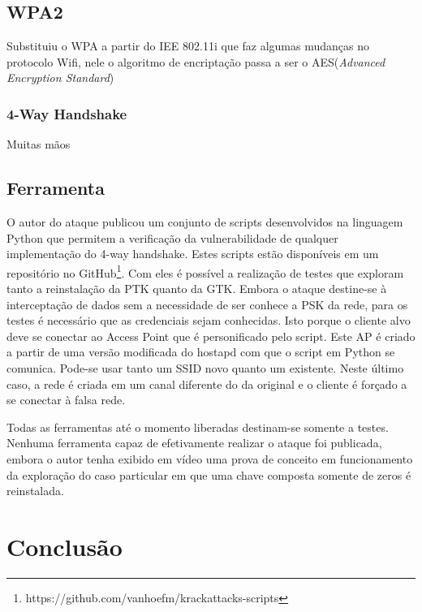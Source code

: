 \documentclass[12pt]{article}
\begin{document}
\subsection{WPA2}
	Substituiu o WPA a partir do IEE 802.11i que faz algumas mudanças no protocolo Wifi, nele o algoritmo de encriptação passa a ser o AES(\textit{Advanced Encryption Standard})
\subsubsection{4-Way Handshake}
Muitas mãos
\subsection{Ferramenta}
O autor do ataque publicou um conjunto de scripts desenvolvidos na linguagem Python que permitem a verificação da vulnerabilidade de qualquer implementação do 4-way handshake. Estes scripts estão disponíveis em um repositório no GitHub\footnote{https://github.com/vanhoefm/krackattacks-scripts}. Com eles é possível a realização de testes que exploram tanto a reinstalação da PTK quanto da GTK. Embora o ataque destine-se à interceptação de dados sem a necessidade de ser conhece a PSK da rede, para os testes é necessário que as credenciais sejam conhecidas. Isto porque o cliente alvo deve se conectar ao Access Point que é personificado pelo script. Este AP é criado a partir de uma versão modificada do hostapd com que o script em Python se comunica. Pode-se usar tanto um SSID novo quanto um existente. Neste último caso, a rede é criada em um canal diferente do da original e o cliente é forçado a se conectar à falsa rede.

Todas as ferramentas até o momento liberadas destinam-se somente a testes. Nenhuma ferramenta capaz de efetivamente realizar o ataque foi publicada, embora o autor tenha exibido em vídeo uma prova de conceito em funcionamento da exploração do caso particular em que uma chave composta somente de zeros é reinstalada.


\section{Conclusão}


     
\end{document}
